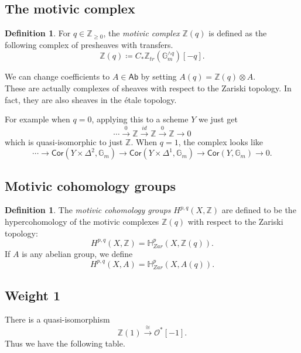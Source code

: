 \documentclass[leqno, openany]{memoir}
\theoremstyle{definition}
\newtheorem{defn}[thm]{Definition}
\theoremstyle{remark}
\theoremstyle{plain}
\theoremstyle{definition}
\theoremstyle{remark}
\newcommand{\G}{\mathbb{G}}
\newcommand{\Z}{\mathbb{Z}}
\newcommand{\mc}[1]{\mathcal{#1}}
\newcommand{\ms}[1]{\mathsf{#1}}
\newcommand{\Cor}{\mathsf{Cor}}
\begin{document}
\subsection{The motivic complex}

\begin{defn} For $q\in \Z_{\ge 0}$, the \textit{motivic complex} $\Z(q)$ is
    defined as the following complex of presheaves with transfers.  \[
    \Z(q)\coloneqq C_*\Z_{tr}(\G_m^{\wedge q})[-q].  \] \end{defn}

We can change coefficients to $A\in \ms{Ab}$ by setting $A(q)=\Z(q)\otimes A$.
\\  

These are actually complexes of sheaves with respect to the Zariski topology.
In fact, they are also sheaves in the \'etale topology.  

For example when $q=0$, applying this to a scheme $Y$ we just get \[
    \cdots\xrightarrow{0} \Z\xrightarrow{id} \Z\xrightarrow{0}\Z\rightarrow 0
    \] which is quasi-isomorphic to just $\Z$.  When $q=1$, the complex looks
    like \[ \cdots\xrightarrow{} \Cor(Y\times\Delta^2, \G_m) \xrightarrow{}
        \Cor(Y\times\Delta^1, \G_m)\xrightarrow{}\Cor(Y, \G_m)\rightarrow 0.
    \]

\subsection{Motivic cohomology groups}

\begin{defn} The \textit{motivic cohomology groups} $H^{p,q}(X, \Z)$ are
    defined to be the hypercohomology of the motivic complexes $\Z(q)$ with
    respect to the Zariski topology: \[ H^{p,q}(X, \Z) = \mathbb{H}^p_{Zar}(X,
    \Z(q)). \] If $A$ is any abelian group, we define \[ H^{p,q}(X, A) =
\mathbb{H}^p_{Zar}(X, A(q)). \] \end{defn}

\subsection{Weight 1} There is a quasi-isomorphism \[
\Z(1)\xrightarrow{\cong}\mc{O}^*[-1].  \] Thus we have the following table.
\end{document}
